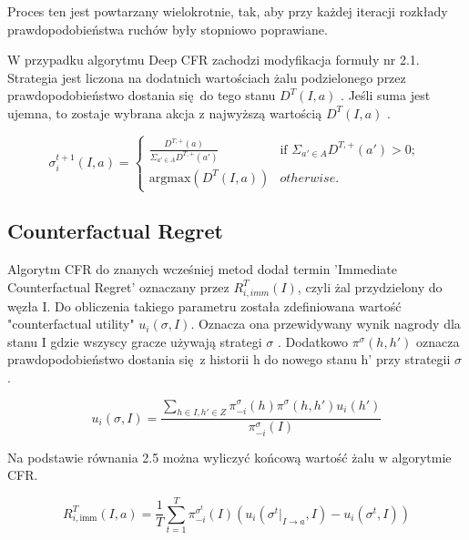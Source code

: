 \documentclass[12pt,oneside,a4paper]{report}
\begin{document}
Proces ten jest powtarzany wielokrotnie, tak, aby przy każdej iteracji rozkłady prawdopodobieństwa
ruchów były stopniowo
poprawiane.

W przypadku algorytmu Deep CFR zachodzi modyfikacja formuły nr 2.1. Strategia jest liczona na
dodatnich wartościach żalu podzielonego przez  prawdopodobieństwo dostania się do 
tego stanu $D^{T} (I, a)$ \cite{DCFR}.
Jeśli suma jest ujemna, to zostaje wybrana akcja z najwyższą wartością $D^{T}(I, a)$ \cite{DCFR}.



\begin{equation}
\sigma^{t+1}_{i}\left(I, a \right) = \left\{ \begin{array}{ll}
      \frac{D^{T, \text{+}}\left(a\right)}{ \Sigma_{a' \in A} D^{T,\text{+}}\left(a'\right)} &
      \mbox{if $\Sigma_{a' \in A} D^{T,\text{+}}\left(a'\right) >
      0$};\\
      \text{argmax}(D^{T} (I, a)) & \mbox{$otherwise$}.\end{array} \right. \ 
\end{equation}



\subsection{Counterfactual Regret}

Algorytm CFR do znanych wcześniej metod dodał termin 'Immediate Counterfactual Regret' oznaczany przez $R^{T}_{i,
imm} (I)$, 
czyli żal przydzielony do węzła I.
Do obliczenia takiego parametru została zdefiniowana wartość "counterfactual utility" $u_{i}(\sigma,
I)$. Oznacza ona przewidywany wynik nagrody dla stanu I gdzie wszyscy gracze używają strategi
$\sigma$ \cite{CFR}. Dodatkowo $\pi^{\sigma} (h, h')$ oznacza prawdopodobieństwo dostania się z historii h do 
nowego stanu h' przy strategii $\sigma$ \cite{CFR}.

\begin{equation}
   u_{i} (\sigma, I) = \frac{\sum_{h \in I, h' \in Z} \pi^{\sigma}_{-i} (h) \pi^{\sigma} (h,
   h') u_{i}(h')}{\pi_{-i}^{\sigma}(I)}
\end{equation}

Na podstawie równania 2.5 można wyliczyć końcową wartość żalu w algorytmie CFR.

\begin{equation}
   R^{T}_{i,\text{imm}} (I, a) = \frac{1}{T} \sum^{T}_{t=1} \pi^{\sigma^{t}}_{-i} (I)
   (u_{i}(\sigma^{t}|_{I \rightarrow a}, I) - u_{i}(\sigma^{t}, I))
\end{equation}
\end{document}
